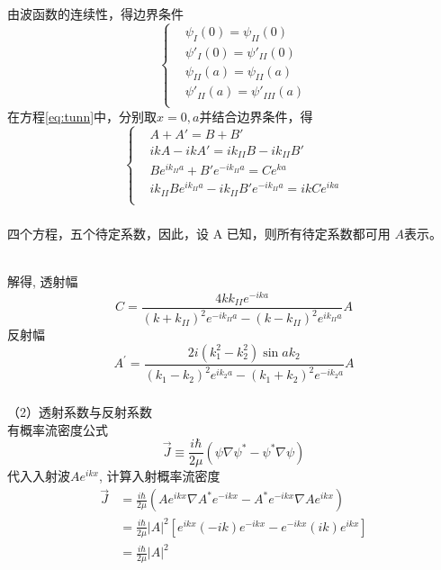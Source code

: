 \begin{frame}
  \frametitle{}
  由波函数的连续性，得边界条件
  \[\left\{\begin{aligned}
    &\psi _{I}(0) = \psi _{II}(0)\\
    &\psi' _{I}(0) = \psi' _{II}(0)\\
    &\psi _{II}(a) = \psi _{II}(a)\\
    &\psi' _{II}(a) = \psi' _{III}(a)\\
  \end{aligned}\right.\]
在方程\ref{eq:tunn}中，分别取$x=0,a$并结合边界条件，得
\[\left\{\begin{aligned}
    &A+A' = B+B'\\
    &ikA-ikA' = ik_{II}B-ik_{II}B' \\
    &B e^{ik_{II}a} + B' e^{-ik_{II}a} = C e^{ka}  \\
    &ik_{II}B e^{ik_{II}a} - ik_{II}B' e^{-ik_{II}a} = ik C e^{ika} \\
  \end{aligned}\right.\]
\end{frame} 

\begin{frame}
  \frametitle{}
四个方程，五个待定系数，因此，设 A 已知，则所有待定系数都可用 $A$表示。

~~\\ 
解得, 透射幅
$$
C=\frac{4 k k_{II} e^{-i k a}}{\left(k+k_{II}\right)^2 e^{-i k_{II} a}-\left(k-k_{II}\right)^2 e^{i k_{II} a}} A
$$
反射幅
$$
A^{\prime}=\frac{2 i\left(k_1^2-k_2^2\right) \sin a k_2}{\left(k_1-k_2\right)^2 e^{i k_2 a}-\left(k_1+k_2\right)^2 e^{-i k_2 a}} A
$$
\end{frame} 

\begin{frame}
  \frametitle{}
  （2）透射系数与反射系数\\
有概率流密度公式
$$
\vec{J} \equiv \frac{i \hbar}{2 \mu}\left(\psi \nabla \psi^*-\psi^* \nabla \psi\right)
$$
代入入射波$Ae^{ikx}$, 计算入射概率流密度
$$
\begin{aligned}
    \vec{J} &= \frac{i \hbar}{2 \mu}\left(Ae^{ikx} \nabla A^* e^{-ikx}-A^*e^{-ikx} \nabla Ae^{ikx}\right) \\ 
    &= \frac{i \hbar}{2 \mu} \left\vert A \right\vert ^2 \left[e^{ikx} (-ik) e^{-ikx} - e^{-ikx}(ik)e^{ikx} \right] \\
    &= \frac{i \hbar}{2 \mu} \left\vert A \right\vert ^2 
\end{aligned}
$$
\end{frame} 

